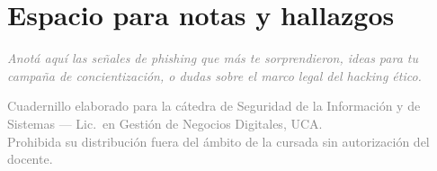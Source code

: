 \documentclass[12pt,a4paper]{article}
\begin{document}
\vspace{1cm}

\section{Espacio para notas y hallazgos}

\begin{tcolorbox}[colback=grisClaro, colframe=gray!50, arc=2mm, height=7cm]
\textcolor{gray}{\itshape Anot\'a aqu\'i las se\~nales de phishing que m\'as te sorprendieron, ideas para tu campa\~na de concientizaci\'on, o dudas sobre el marco legal del hacking \'etico.}
\end{tcolorbox}

\vfill
\begin{center}
\small\textcolor{gray}{%
Cuadernillo elaborado para la c\'atedra de Seguridad de la Informaci\'on y de
Sistemas --- Lic.\ en Gesti\'on de Negocios Digitales, UCA.\\
Prohibida su distribuci\'on fuera del \'ambito de la cursada sin autorizaci\'on del docente.}
\end{center}
\end{document}
